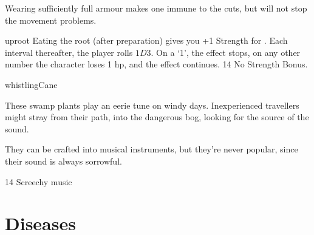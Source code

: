 \begin{multicols}{2}
Wearing sufficiently full armour makes one immune to the cuts, but will not stop the movement problems.

%
  {uproot}%
  {
  Eating the root (after preparation) gives you +1 Strength for .
  Each \gls{interval} thereafter, the player rolls $1D3$.
  On a `1', the effect stops, on any other number the character loses 1 \gls{hp}, and the effect continues.
    }
{}%
{14}%
{No Strength Bonus.}%

%
  {whistlingCane}%
  {
  These swamp plants play an eerie tune on windy days.
  Inexperienced travellers might stray from their path, into the dangerous bog, looking for the source of the sound.

  They can be crafted into musical instruments, but they're never popular, since their sound is always sorrowful.
  }
{}%
{14}%
{Screechy music}%

\end{multicols}

\section{Diseases}
\label{diseases}

\newcommand\disease[5][\roll{Intelligence}{Medicine}]{
  \subsubsection{#2}
  \index{#2 \glsentrytext{sickness}}
  \label{#2}
  #3
  \needspace{2em}
  \begin{description}
    \item[\flwr~\Glspl{ingredient}] #4
    \item[Roll] #1 (\tn[#5])
  \end{description}
}

